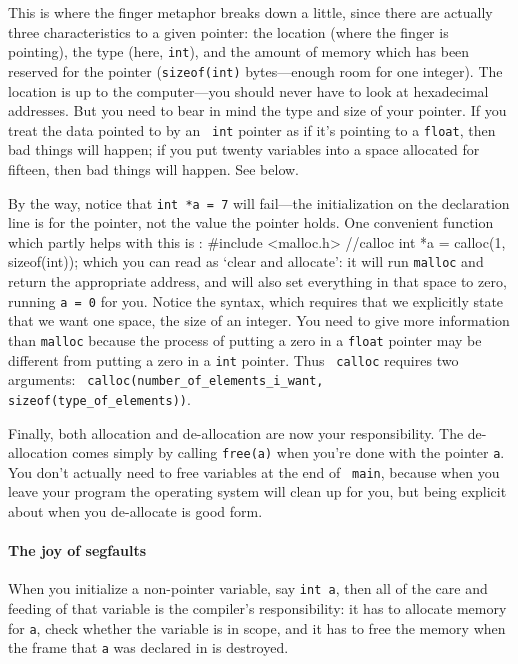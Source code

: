 \documentclass[12pt]{article}
\makeatletter
\def\ttind#1{\index{#1@{\tt #1}}{\tt #1}}
\def\ttindex#1{\index{#1@{\tt #1}}}
\makeatother
\begin{document}
This is where the finger metaphor breaks down a little, since there are actually three characteristics
to a given pointer: the location (where the finger is pointing), the type (here, {\tt int}), and the
amount of memory which has been reserved for the pointer ({\tt sizeof(int)} bytes---enough room for one
integer). The location is up to the computer---you should never have
to look at hexadecimal addresses. But you need to bear in mind the type
and size of your pointer. If you treat the data pointed to by an {\tt
int} pointer as if it's pointing to a {\tt float}, then bad things will
happen; if you put twenty variables into a space allocated for fifteen,
then bad things will happen. See below.

By the way, notice that {\tt int *a = 7} will fail---the initialization on the declaration line is for
the pointer, not the value the pointer holds. One convenient function which partly helps with this is
\ttind{calloc}:
#include <malloc.h>  //calloc
    int *a = calloc(1, sizeof(int));
which you can read as `clear and allocate': it will run {\tt malloc}
and return the appropriate address, and will also set everything in
that space to zero, running {\tt *a = 0} for you. Notice the syntax,
which requires that we explicitly state that we want one space, the
size of an integer. You need to give more information than {\tt malloc}
because the process of putting a zero in a {\tt float} pointer may be
different from putting a zero in a {\tt int} pointer. Thus {\tt
calloc} requires two arguments: {\tt
calloc(number\_of\_elements\_i\_want, sizeof(type\_of\_elements))}.

Finally, both allocation and de-allocation are now your
responsibility. The de-allocation comes simply by calling {\tt free(a)} \ttindex{free}
when you're done with the pointer {\tt a}. You don't actually need to free variables at the end of {\tt
main}, because when you leave your program the operating system will clean up for you, but being explicit
about when you de-allocate is good form.

\paragraph{The joy of segfaults}  
When you initialize a non-pointer variable, say {\tt int a}, then all of
the care and feeding of that variable is the compiler's responsibility:
it has to allocate memory for {\tt a}, check whether the variable is
in scope, and it has to free the memory when the frame that {\tt a}
was declared in is destroyed.
\end{document}
